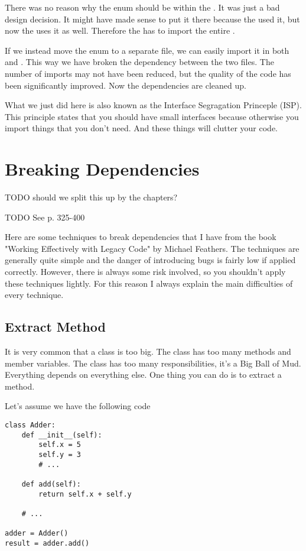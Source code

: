 There was no reason why the  enum should be within the . It was just a bad design decision. It might have made sense to put it there because the  used it, but now the  uses it as well. Therefore the  has to import the entire .

If we instead move the  enum to a separate file, we can easily import it in both  and . This way we have broken the dependency between the two files. The number of imports may not have been reduced, but the quality of the code has been significantly improved. Now the dependencies are cleaned up.

What we just did here is also known as the Interface Segragation Princeple (ISP). This principle states that you should have small interfaces because otherwise you import things that you don't need. And these things will clutter your code.

\section{Breaking Dependencies}

TODO should we split this up by the chapters?

TODO See p. 325-400

Here are some techniques to break dependencies that I have from the book "Working Effectively with Legacy Code" by Michael Feathers. The techniques are generally quite simple and the danger of introducing bugs is fairly low if applied correctly. However, there is always some risk involved, so you shouldn't apply these techniques lightly. For this reason I always explain the main difficulties of every technique.

\subsection{Extract Method}

It is very common that a class is too big. The class has too many methods and member variables. The class has too many responsibilities, it's a Big Ball of Mud. Everything depends on everything else. One thing you can do is to extract a method.

Let's assume we have the following code

\begin{programcode}{}
\begin{verbatim}
class Adder:
    def __init__(self):
        self.x = 5
        self.y = 3
        # ...

    def add(self):
        return self.x + self.y
    
    # ...

adder = Adder()
result = adder.add()
\end{verbatim}
\end{programcode}

